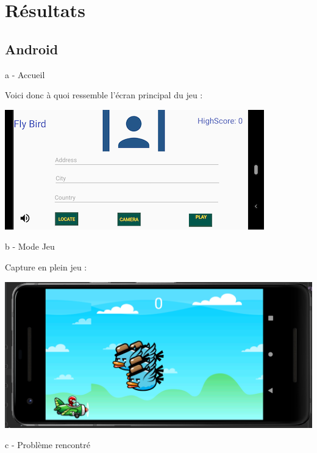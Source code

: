 \documentclass{rapportECL}
\begin{document}
\newpage
\section{Résultats}
\subsection{Android}
a - Accueil

Voici donc à quoi ressemble l'écran principal du jeu : 

\begin{center}
    \includegraphics[scale = 0.5]{logos/accueil.png}
\end{center}

b - Mode Jeu

Capture en plein jeu : 

\begin{center}
    \includegraphics[scale = 0.5]{logos/ModeGame.png}
\end{center}

c - Problème rencontré
\end{document}
